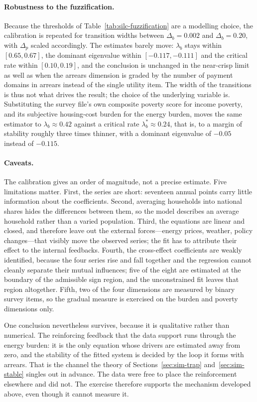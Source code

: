 \documentclass[11pt,a4paper]{article}
\begin{document}
\paragraph{Robustness to the fuzzification.}
Because the thresholds of Table~\ref{tab:silc-fuzzification} are a modelling choice, the calibration is repeated for transition widths between $\Delta_b=0.002$ and $\Delta_b=0.20$, with $\Delta_p$ scaled accordingly. The estimates barely move: $\lambda_b$ stays within $[0.65,0.67]$, the dominant eigenvalue within $[-0.117,-0.111]$ and the critical rate within $[0.10,0.19]$, and the conclusion is unchanged in the near-crisp limit as well as when the arrears dimension is graded by the number of payment domains in arrears instead of the single utility item. The width of the transitions is thus not what drives the result; the choice of the underlying variable is. Substituting the survey file's own composite poverty score for income poverty, and its subjective housing-cost burden for the energy burden, moves the same estimator to $\lambda_b\approx0.42$ against a critical rate $\lambda_b^*\approx0.24$, that is, to a margin of stability roughly three times thinner, with a dominant eigenvalue of $-0.05$ instead of $-0.115$.

\paragraph{Caveats.}
The calibration gives an order of magnitude, not a precise estimate. Five limitations matter. First, the series are short: seventeen annual points carry little information about the coefficients. Second, averaging households into national shares hides the differences between them, so the model describes an average household rather than a varied population. Third, the equations are linear and closed, and therefore leave out the external forces—energy prices, weather, policy changes—that visibly move the observed series; the fit has to attribute their effect to the internal feedbacks. Fourth, the cross-effect coefficients are weakly identified, because the four series rise and fall together and the regression cannot cleanly separate their mutual influences; five of the eight are estimated at the boundary of the admissible sign region, and the unconstrained fit leaves that region altogether. Fifth, two of the four dimensions are measured by binary survey items, so the gradual measure is exercised on the burden and poverty dimensions only.

One conclusion nevertheless survives, because it is qualitative rather than numerical. The reinforcing feedback that the data support runs through the energy burden: it is the only equation whose drivers are estimated away from zero, and the stability of the fitted system is decided by the loop it forms with arrears. That is the channel the theory of Sections~\ref{sec:sim-trap} and~\ref{sec:sim-stable} singles out in advance. The data were free to place the reinforcement elsewhere and did not. The exercise therefore supports the mechanism developed above, even though it cannot measure it.
\end{document}
